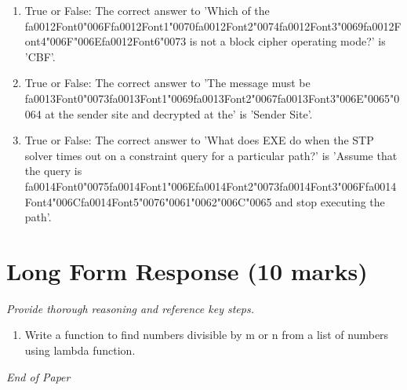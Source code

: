 \documentclass[12pt]{article}
\begin{document}
\begin{enumerate}[label=\arabic*.]
\item True or False: The correct answer to 'Which of the {\csname fa0012Font0\endcsname\char"006F}{\csname fa0012Font1\endcsname\char"0070}{\csname fa0012Font2\endcsname\char"0074}{\csname fa0012Font3\endcsname\char"0069}{\csname fa0012Font4\endcsname\char"006F}{\char"006E}{\csname fa0012Font6\endcsname\char"0073} is not a block cipher operating mode?' is 'CBF'.
\item True or False: The correct answer to 'The message must be {\csname fa0013Font0\endcsname\char"0073}{\csname fa0013Font1\endcsname\char"0069}{\csname fa0013Font2\endcsname\char"0067}{\csname fa0013Font3\endcsname\char"006E}{\char"0065}{\char"0064} at the sender site and decrypted at the' is 'Sender Site'.
\item True or False: The correct answer to 'What does EXE do when the STP solver times out on a constraint query for a particular path?' is 'Assume that the query is {\csname fa0014Font0\endcsname\char"0075}{\csname fa0014Font1\endcsname\char"006E}{\csname fa0014Font2\endcsname\char"0073}{\csname fa0014Font3\endcsname\char"006F}{\csname fa0014Font4\endcsname\char"006C}{\csname fa0014Font5\endcsname\char"0076}{\char"0061}{\char"0062}{\char"006C}{\char"0065} and stop executing the path'.
\end{enumerate}

\section*{Long Form Response (10 marks)}
\textit{Provide thorough reasoning and reference key steps.}
\begin{enumerate}[label=\arabic*.]
\item Write a function to find numbers divisible by m or n from a list of numbers using lambda
function.
\end{enumerate}

\vfill
\noindent\textit{End of Paper}
\end{document}
